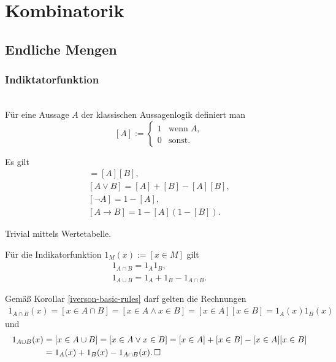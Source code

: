 
\chapter{Kombinatorik}

\section{Endliche Mengen}

\subsection{Indiktatorfunktion}

\begin{Definition}\mbox{}\\
Für eine Aussage $A$ der klassischen Aussagenlogik definiert man
\[[A] := \begin{cases}
1 &\text{wenn}\;A,\\
0 &\text{sonst}.
\end{cases}\]
\end{Definition}

\begin{Korollar}\label{iverson-basic-rules}
Es gilt
\begin{gather*}
[A\land B] = [A][B],\\
[A\lor B] = [A]+[B]-[A][B],\\
[\neg A] = 1-[A],\\
[A\to B] = 1-[A](1-[B]).
\end{gather*}
\end{Korollar}
\begin{Beweis} Trivial mittels Wertetabelle.\,\qedsymbol
\end{Beweis}

\begin{Korollar}\label{indicator-set-op}
Für die Indikatorfunktion $1_M(x):=[x\in M]$ gilt
\begin{gather*}
1_{A\cap B} = 1_A 1_B,\\
1_{A\cup B} = 1_A + 1_B - 1_{A\cap B}.
\end{gather*}
\end{Korollar}
\begin{Beweis}
Gemäß Korollar \ref{iverson-basic-rules} darf gelten die
Rechnungen
\begin{align*}
1_{A\cap B}(x) = [x\in A\cap B]
= [x\in A\land x\in B] = [x\in A][x\in B] = 1_A(x)1_B(x)
\end{align*}
und
\begin{align*}
1_{A\cup B}(x) &= [x\in A\cup B] = [x\in A\lor x\in B]
= [x\in A] + [x\in B] - [x\in A][x\in B]\\
&= 1_A(x) + 1_B(x) - 1_{A\cap B}(x).\,\square
\end{align*}
\end{Beweis}

